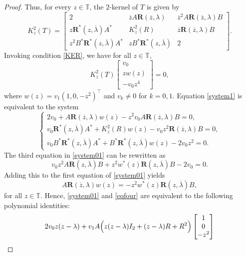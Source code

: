 \documentclass[12pt, reqno]{amsart}
\theoremstyle{definition}
\theoremstyle{remark}
\numberwithin{equation}{section}
\begin{document}
\begin{proof}
	Thus, for every $z\in \mathbb{T}$, the $2$-kernel of $T$ is given by
	\[
	K_z^2(T) = \begin{bmatrix}
		2 & \overline{z} A \mathbf{R}(\overline{z}, \lambda) & \overline{z}^2 A \mathbf{R}(\overline{z}, \lambda)B\\
		z \mathbf{R}^*(z, \overline{\lambda})A^* & K_z^2(R) & \overline{z}\mathbf{R}(\overline{z}, \lambda) B\\
		z^2 B^* \mathbf{R}^*(z, \overline{\lambda})A^* & z B^* \mathbf{R}^*(z, \overline{\lambda}) & 2
	\end{bmatrix}.
	\] 
	Invoking condition \eqref{KER}, we have for all $z\in \mathbb{T}$,
	\begin{equation}\label{system1} 
		K_{z}^{2}(T) \begin{bmatrix} v_0 \\ z w(z) \\ -v_0 z^4 \end{bmatrix} = 0,
	\end{equation}
	where $w(z) = v_1(1, 0, -z^2)^\top$ and $v_k \neq 0$ for $k=0,1$. Equation \eqref{system1} is equivalent to the system
	\begin{equation}\label{system01} 
		\begin{cases}
			2v_0 + A \mathbf{R}(\overline{z}, \lambda) w(z) - z^2 v_0 A \mathbf{R}(\overline{z}, \lambda) B = 0,\\
			v_0 \mathbf{R}^*(z, \overline{\lambda})A^* + K_z^2(R)w(z) - v_0 z^2 \mathbf{R}(\overline{z}, \lambda) B = 0,\\
			v_0 B^*\mathbf{R}^*(z, \overline{\lambda})A^* + B^*\mathbf{R}^*(z, \overline{\lambda})w(z) - 2v_0 z^2 = 0.
		\end{cases} 
	\end{equation}
	The third equation in \eqref{system01} can be rewritten as
	\[
	v_0 z^2 A \mathbf{R}(z, \overline{\lambda}) B + z^2 w^*(z) \mathbf{R}(z, \overline{\lambda}) B - 2v_0 = 0.
	\]
	Adding this to the first equation of \eqref{system01} yields
	\begin{equation}\label{eqfour}
		A \mathbf{R}(\overline{z}, \lambda) w(z) = -z^2 w^*(z) \mathbf{R}(z, \overline{\lambda}) B,
	\end{equation}
	for all $z\in \mathbb{T}$. Hence, \eqref{system01} and \eqref{eqfour} are equivalent to the following polynomial identities:
	\begin{align}
		2v_0 z(z-\lambda) &+ v_1 A \Bigl(  z(z-\lambda)I_2 + (z-\lambda)R + R^2 \Bigr) 
		\begin{bmatrix} 1\\0\\-z^2 \end{bmatrix} \nonumber \\

\end{align}
\end{proof}
\end{document}
